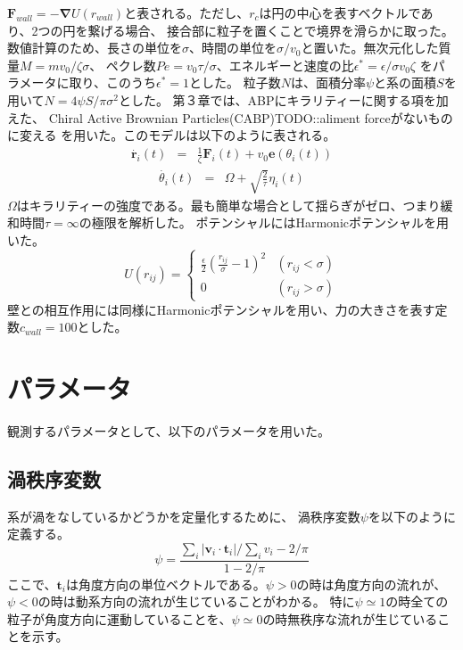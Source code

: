 \documentclass[/Users/ikedahajime/GitHub/reserch/master_report/thesis]{subfiles}
\begin{document}
$\bm{F}_{wall}=-\bm{\nabla}U(r_{wall})$と表される。ただし、$r_c$は円の中心を表すベクトルであり、2つの円を繋げる場合、
接合部に粒子を置くことで境界を滑らかに取った。%
\\
数値計算のため、長さの単位を$\sigma$、時間の単位を$\sigma/v_0$と置いた。無次元化した質量$M=mv_0/\zeta\sigma$、
ペクレ数$Pe=v_0\tau/\sigma$、エネルギーと速度の比$\epsilon^*=\epsilon/\sigma v_0 \zeta$
をパラメータに取り、このうち$\epsilon^*=1$とした。
粒子数$N$は、面積分率$\psi$と系の面積$S$を用いて$N=4\psi S/\pi\sigma^2$とした。
第３章では、ABPにキラリティーに関する項を加えた、 Chiral Active Brownian Particles(CABP)\cite{teeffelenDynamicsBrownianCircle2008}TODO::aliment forceがないものに変える
を用いた。このモデルは以下のように表される。
\begin{eqnarray}
    \dot{\bm{r}_i}(t) &=& \frac{1}{\zeta} \bm{F}_i(t)+v_0 \bm{e}(\theta_i (t))
\end{eqnarray}
\begin{eqnarray}
    \dot{\theta_i }(t) &=& \Omega+\sqrt{\frac{2}{\tau}}\eta_i(t)
\end{eqnarray}
$\Omega$はキラリティーの強度である。最も簡単な場合として揺らぎがゼロ、つまり緩和時間$\tau=\infty$の極限を解析した。
ポテンシャルにはHarmonicポテンシャルを用いた。
\begin{equation}
    U(r_{ij})=
    \begin{cases}
        \frac{\epsilon}{2}\left(\frac{r_{ij}}{\sigma}-1\right)^2 &(r_{ij}<\sigma)\\
        0 & (r_{ij}>\sigma)

    \end{cases}
\end{equation}
壁との相互作用には同様にHarmonicポテンシャルを用い、力の大きさを表す定数$c_{wall}=100$とした。

\section{パラメータ}
観測するパラメータとして、以下のパラメータを用いた。
\subsection{渦秩序変数}\label{subsec:vortes_order_parameter}
系が渦をなしているかどうかを定量化するために、
渦秩序変数$\psi$\cite{wiolandConfinementStabilizesBacterial2013}を以下のように定義する。
\begin{equation}
    \psi=\frac{\sum_i \left|\bm{v}_i\cdot \bm{t}_i \right|/\sum_i v_i -2/\pi}{1-2/\pi}
\end{equation}
ここで、$\bm{t}_i$は角度方向の単位ベクトルである。$\psi>0$の時は角度方向の流れが、$\psi<0$の時は動系方向の流れが生じていることがわかる。
特に$\psi\simeq1$の時全ての粒子が角度方向に運動していることを、$\psi\simeq0$の時無秩序な流れが生じていることを示す。
\end{document}
